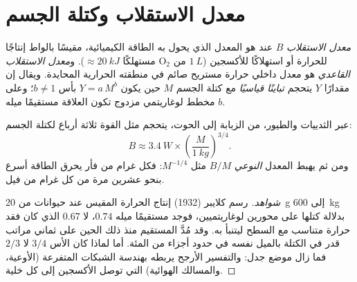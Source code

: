 \section{معدل الاستقلاب وكتلة الجسم}

\begin{definition}\label{def:b1:organism-environment:allometry}
\emph{معدل الاستقلاب} $B$ عند  هو
المعدل الذي يحول به الطاقة الكيميائية، مقيسًا بالواط إنتاجًا للحرارة
أو استهلاكًا للأكسجين ($\qty{1}{L}$ من $\mathrm{O_2}$ مستهلكًا
$\approx \qty{20}{kJ}$). و\emph{معدل الاستقلاب القاعدي}
هو معدل داخلي حرارة مستريح صائم في منطقته الحرارية المحايدة. ويقال
إن مقدارًا $Y$ يتحجم \emph{تباينًا قياسيًا}
مع كتلة الجسم $M$ حين يكون $Y = a\,M^{b}$ بأس $b \neq 1$؛ وعلى مخطط
لوغاريتمي مزدوج تكون العلاقة مستقيمًا ميله $b$.
\end{definition}

\begin{theorem}\label{thm:b1:organism-environment:kleiber}
عبر الثدييات والطيور، من الزبابة إلى الحوت، يتحجم  مثل القوة ثلاثة أرباع لكتلة الجسم:
\[
B \approx \qty{3.4}{W}\times\left(\frac{M}{\qty{1}{kg}}\right)^{3/4}.
\]
ومن ثم يهبط المعدل \emph{النوعي} $B/M$ مثل $M^{-1/4}$: فكل غرام من
فأر يحرق الطاقة أسرع بنحو عشرين مرة من كل غرام من فيل.
\end{theorem}
\begin{proof}[شواهد]
رسم كلايبر (1932) إنتاج الحرارة المقيس عند حيوانات من \qty{20}{g}
إلى \qty{600}{kg} بدلالة كتلها على محورين لوغاريتميين، فوجد مستقيمًا
ميله $0.74$، لا $0.67$ الذي كان فقد حرارة متناسب مع السطح ليتنبأ به.
وقد مُدَّ المستقيم منذ ذلك الحين على ثماني مراتب قدر في الكتلة
بالميل نفسه في حدود أجزاء من المئة. أما لماذا كان الأس $3/4$ لا
$2/3$ فما زال موضع جدل: والتفسير الأرجح يربطه بهندسة الشبكات
المتفرعة (الأوعية، والمسالك الهوائية) التي توصل الأكسجين إلى كل
خلية.
\end{proof}

